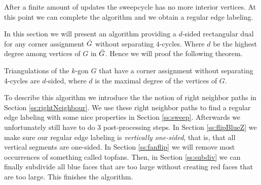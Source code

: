   After a finite amount of updates the sweepcycle has no more interior vertices. At this point we can complete the algorithm and we obtain a regular edge labeling.

  In this section we will present an algorithm providing a $d$-sided rectangular dual for any corner assignment $\bar{G}$ without separating $4$-cycles. Where $d$ be the highest degree among vertices of $G$ in $\bar{G}$.  Hence we will proof the following theorem.

  \begin{thrm}
  \label{th:dsided}
  Triangulations of the $k$-gon $G$ that have a corner assignment without separating 4-cycles are $d$-sided, where $d$ is the maximal degree of the vertices of $G$.
  \end{thrm}

  To describe this algorithm we introduce the the notion of right neighbor paths in Section \ref{ss:rightNeighbour}.  We use these right neighbor paths to find a regular edge labeling with some nice properties in Section \ref{ss:sweep}. Afterwards we unfortunately still have to do $3$ post-processing steps. In Section \ref{ss:flipBlueZ} we make sure our regular edge labeling is \emph{vertically one-sided}, that is, that all vertical segments are one-sided. In Section \ref{ss:fanflip} we will remove most occurrences of something called topfans. Then, in Section \ref{ss:subdiv} we can finally subdivide all blue faces that are too large without creating red faces that are too large. This finishes the algorithm.
